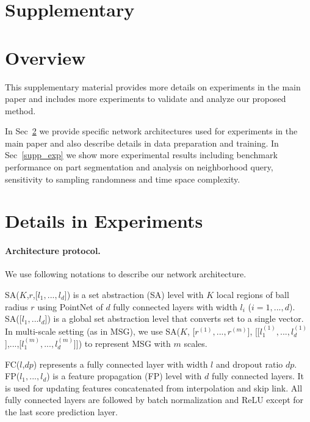 \appendix
\section*{Supplementary}

\section{Overview}
This supplementary material provides more details on experiments in the main paper and includes more experiments to validate and analyze our proposed method.

In Sec~\ref{supp_details} we provide specific network architectures used for experiments in the main paper and also describe details in data preparation and training. In Sec~\ref{supp_exp} we show more experimental results including benchmark performance on part segmentation and analysis on neighborhood query, sensitivity to sampling randomness and time space complexity.

\section{Details in Experiments}
\label{supp_details}
\paragraph{Architecture protocol.}
We use following notations to describe our network architecture.

SA($K$,$r$,[$l_1,...,l_d$]) is a set abstraction (SA) level with $K$ local regions of ball radius $r$ using PointNet of $d$ fully connected layers with width $l_i$ ($i=1,...,d$). SA([$l_1,...l_d$]) is a global set abstraction level that converts set to a single vector. In multi-scale setting (as in MSG), we use SA($K$, [$r^{(1)},...,r^{(m)}$], [[$l_{1}^{(1)},...,l_{d}^{(1)}$],...,[$l_{1}^{(m)},...,l_{d}^{(m)}$]]) to represent MSG with $m$ scales.

FC($l$,$dp$) represents a fully connected layer with width $l$ and dropout ratio $dp$. FP($l_1,...,l_d$) is a feature propagation (FP) level with $d$ fully connected layers. It is used for updating features concatenated from interpolation and skip link. All fully connected layers are followed by batch normalization and ReLU except for the last score prediction layer.

